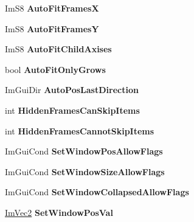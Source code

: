 \begin{DoxyCompactItemize}
\item 
\mbox{\label{structImGuiWindow_a6d4f86b634dd0fc124e216282b5a110c}} 
Im\+S8 {\bfseries Auto\+Fit\+FramesX}
\item 
\mbox{\label{structImGuiWindow_a134c07e0db4129ee43fafb1937429839}} 
Im\+S8 {\bfseries Auto\+Fit\+FramesY}
\item 
\mbox{\label{structImGuiWindow_aea6c6eca60515ed1a5afd5d0c1f8601c}} 
Im\+S8 {\bfseries Auto\+Fit\+Child\+Axises}
\item 
\mbox{\label{structImGuiWindow_a3583d20a57fea8c8491f14f2dcda483c}} 
bool {\bfseries Auto\+Fit\+Only\+Grows}
\item 
\mbox{\label{structImGuiWindow_aa8219e984ed273d6cfd19fb4b93eff5e}} 
Im\+Gui\+Dir {\bfseries Auto\+Pos\+Last\+Direction}
\item 
\mbox{\label{structImGuiWindow_a50e68452f4d3c826683da4cb1a67a67e}} 
int {\bfseries Hidden\+Frames\+Can\+Skip\+Items}
\item 
\mbox{\label{structImGuiWindow_af7b3498668cc62e35b7fbd3243ea26e2}} 
int {\bfseries Hidden\+Frames\+Cannot\+Skip\+Items}
\item 
\mbox{\label{structImGuiWindow_a8ff69a8bdc9221c9cc7d8ba656013d84}} 
Im\+Gui\+Cond {\bfseries Set\+Window\+Pos\+Allow\+Flags}
\item 
\mbox{\label{structImGuiWindow_a0c9419d95253214cb2a71d6ead1e03d6}} 
Im\+Gui\+Cond {\bfseries Set\+Window\+Size\+Allow\+Flags}
\item 
\mbox{\label{structImGuiWindow_a48384a3767252325e5c71b534adc58a9}} 
Im\+Gui\+Cond {\bfseries Set\+Window\+Collapsed\+Allow\+Flags}
\item 
\mbox{\label{structImGuiWindow_a6caed47ef8e25a2e7a68a6be72c5716a}} 
\hyperlink{structImVec2}{Im\+Vec2} {\bfseries Set\+Window\+Pos\+Val}
\item 
\mbox{\label{structImGuiWindow_a4de5608bf44728447327d832fa84f0c9}} 

\end{DoxyCompactItemize}
